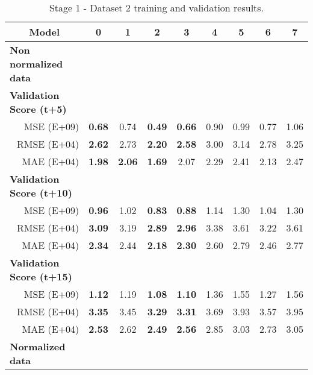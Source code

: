 \begin{table}[htbp]
  \centering
  \caption{Stage 1 - Dataset 2 training and validation results.}
     \begin{tabular}{r|cccccccc}
        \toprule
        \multicolumn{1}{c}{\textbf{Model}} & 0     & 1     & 2     & 3     & 4     & 5     & 6     & 7 \\
        \midrule
        \multicolumn{1}{l|}{\textbf{Non normalized data}} &       &       &       &       &       &       &       &  \\
        \multicolumn{1}{l|}{\textbf{            Validation Score (t+5)      }} &       &       &       &       &       &       &       &  \\
        MSE (E+09)   & \textbf{0.68} & 0.74  & \textbf{0.49} & \textbf{0.66} & 0.90  & 0.99  & 0.77  & 1.06 \\
        RMSE (E+04)   & \textbf{2.62} & 2.73  & \textbf{2.20} & \textbf{2.58} & 3.00  & 3.14  & 2.78  & 3.25 \\
        MAE (E+04)   & \textbf{1.98} & \textbf{2.06} & \textbf{1.69} & 2.07  & 2.29  & 2.41  & 2.13  & 2.47 \\
        \multicolumn{1}{l|}{\textbf{            Validation Score (t+10)               }} &       &       &       &       &       &       &       &  \\
        MSE (E+09)   & \textbf{0.96} & 1.02  & \textbf{0.83} & \textbf{0.88} & 1.14  & 1.30  & 1.04  & 1.30 \\
        RMSE (E+04)   & \textbf{3.09} & 3.19  & \textbf{2.89} & \textbf{2.96} & 3.38  & 3.61  & 3.22  & 3.61 \\
        MAE (E+04)   & \textbf{2.34} & 2.44  & \textbf{2.18} & \textbf{2.30} & 2.60  & 2.79  & 2.46  & 2.77 \\
        \multicolumn{1}{l|}{\textbf{            Validation Score (t+15)               }} &       &       &       &       &       &       &       &  \\
        MSE (E+09)   & \textbf{1.12} & 1.19  & \textbf{1.08} & \textbf{1.10} & 1.36  & 1.55  & 1.27  & 1.56 \\
        RMSE (E+04)   & \textbf{3.35} & 3.45  & \textbf{3.29} & \textbf{3.31} & 3.69  & 3.93  & 3.57  & 3.95 \\
        MAE (E+04)   & \textbf{2.53} & 2.62  & \textbf{2.49} & \textbf{2.56} & 2.85  & 3.03  & 2.73  & 3.05 \\
        \midrule
        \multicolumn{1}{l|}{\textbf{Normalized data}} &       &       &       &       &       &       &       &  \\

\end{tabular}
\end{table}
